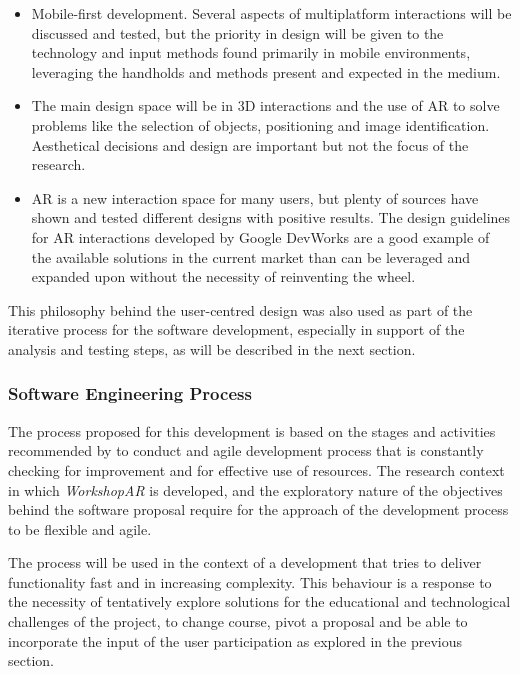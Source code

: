 \begin{itemize}
    \item Mobile-first development. Several aspects of multiplatform interactions will be discussed and tested, but the priority in design will be
    given to the technology and input methods found primarily in mobile environments, leveraging the handholds and methods present and expected in the medium.
    \item The main design space will be in 3D interactions and the use of \ac{AR} to solve problems like the selection of objects, positioning and image identification.
    Aesthetical decisions and design are important but not the focus of the research.
    \item \ac{AR} is a new interaction space for many users, but plenty of sources have shown and tested different designs with positive results. The design guidelines for
    \ac{AR} interactions developed by Google DevWorks \parencite{arcore_2025} are a good example of the available solutions in the current market than can be leveraged and
    expanded upon without the necessity of reinventing the wheel.
\end{itemize}

This philosophy behind the user-centred design was also used as part of the iterative process for the software development, especially in support of the analysis and
testing steps, as will be described in the next section.

\subsubsection{Software Engineering Process \label{sec:3-3-2-2}}

The process proposed for this development is based on the stages and activities recommended by \textcite{salo_2007} to conduct and agile development process that is
constantly checking for improvement and for effective use of resources. The research context in which \emph{WorkshopAR} is developed, and the exploratory nature of the objectives
behind the software proposal require for the approach of the development process to be flexible and agile.

The process will be used in the context of a development that tries to deliver functionality fast and in increasing complexity. This behaviour is a response to the
necessity of tentatively explore solutions for the educational and technological challenges of the project, to change course, pivot a proposal and be able to incorporate
the input of the user participation as explored in the previous section.

